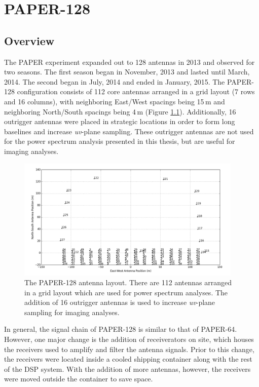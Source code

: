 \chapter{PAPER-128}
\label{c.PSA128}

\section{Overview}

The PAPER experiment expanded out to 128 antennas in 2013 and observed for two seasons. The first season began in November, 2013 and lasted until March, 2014. The second began in July, 2014 and ended in January, 2015. The PAPER-128 configuration consists of 112 core antennas arranged in a grid layout (7 rows and 16 columns), with neighboring East/West spacings being 15\,m and neighboring North/South spacings being 4\,m (Figure \ref{fig:paper128_array}). Additionally, 16 outrigger antennas were placed in strategic locations in order to form long baselines and increase \textit{uv}-plane sampling. These outrigger antennas are not used for the power spectrum analysis presented in this thesis, but are useful for imaging analyses.

\begin{figure}
	\centering
	\includegraphics[width=0.96\textwidth]{plots/paper128_layout.png}
	\caption{The PAPER-128 antenna layout. There are 112 antennas arranged in a grid layout which are used for power spectrum analyses. The addition of 16 outrigger antennas is used to increase \textit{uv}-plane sampling for imaging analyses.}
	\label{fig:paper128_array}
\end{figure}

In general, the signal chain of PAPER-128 is similar to that of PAPER-64. However, one major change is the addition of receiverators on site, which houses the receivers used to amplify and filter the antenna signals. Prior to this change, the receivers were located inside a cooled shipping container along with the rest of the DSP system. With the addition of more antennas, however, the receivers were moved outside the container to save space. 

